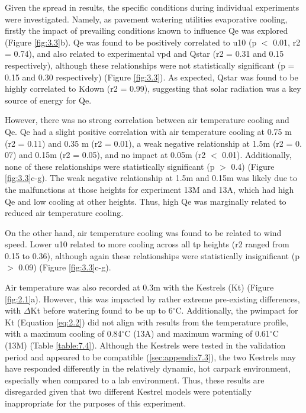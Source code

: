 \documentclass[final,3p,times,authoryear]{elsarticle}
\begin{document}
Given the spread in results, the specific conditions during individual experiments were
investigated. Namely, as pavement watering utilities evaporative cooling, firstly the
impact of prevailing conditions known to influence \gls{Qe} was explored (Figure \ref{fig:3.3}b). \gls{Qe} was found to be positively correlated to \gls{u10} (\gls{p} $<$ 0.01, \gls{r2} = 0.74), and also related to experimental \gls{vpd} and \gls{Qstar} (\gls{r2} = 0.31 and 0.15 respectively), although these relationships were not statistically significant (\gls{p} = 0.15 and 0.30 respectively) (Figure \ref{fig:3.3}). As expected, \gls{Qstar} was found to be highly correlated to \gls{Kdown} (\gls{r2} = 0.99), suggesting that solar radiation was a key source of energy for \gls{Qe}.

However, there was no strong correlation between air temperature cooling and \gls{Qe}. \gls{Qe} had a slight positive correlation with air temperature cooling at 0.75 m (\gls{r2} = 0.11) and 0.35 m (\gls{r2} = 0.01), a weak negative relationship at 1.5m (\gls{r2} = 0. 07) and 0.15m (\gls{r2} = 0.05), and no impact at 0.05m (\gls{r2} $<$ 0.01). Additionally, none of these relationships were statistically significant (\gls{p} $>$ 0.4) (Figure \ref{fig:3.3}c-g). The weak negative relationship at 1.5m and 0.15m was likely due to the malfunctions at those heights for experiment 13M and 13A, which had high \gls{Qe} and low cooling at other heights. Thus, high \gls{Qe} was marginally related to reduced air temperature cooling.

On the other hand, air temperature cooling was found to be related to wind speed.
Lower \gls{u10} related to more cooling across all \gls{tp} heights (\gls{r2} ranged from 0.15 to 0.36), although again these relationships were statistically insignificant (\gls{p} $>$ 0.09) (Figure \ref{fig:3.3}c-g).

Air temperature was also recorded at 0.3m with the Kestrels (\gls{Kt}) (Figure \ref{fig:2.1}a). However, this was impacted by rather extreme pre-existing differences, with $\Delta$\gls{Kt} before watering found to be up to 6$^{\circ}$C. Additionally, the \gls{pwimpact} for \gls{Kt} (Equation \ref{eq:2.2}) did not align with results from the temperature profile, with a maximum cooling of 0.84$^{\circ}$C (13A) and maximum warming of 0.61$^{\circ}$C (13M) (Table \ref{table:7.4}). Although the Kestrels were tested in the validation period and appeared to be compatible (\ref{sec:appendix7.3}), the two Kestrels may have responded differently in the relatively dynamic, hot carpark environment, especially when compared to a lab environment. Thus, these results are disregarded given that two different Kestrel models were potentially inappropriate for the purposes of this experiment.
\end{document}
